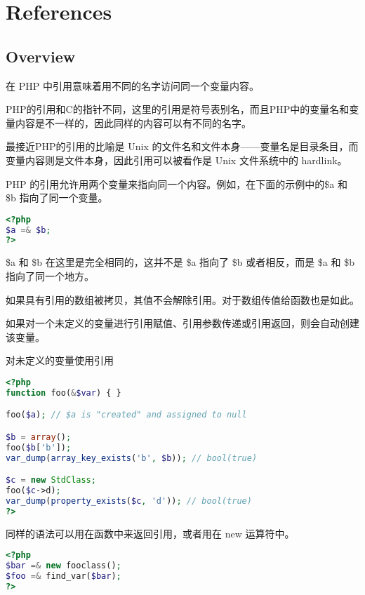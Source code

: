 \part{References}


\chapter{Overview}


在 PHP 中引用意味着用不同的名字访问同一个变量内容。

PHP的引用和C的指针不同，这里的引用是符号表别名，而且PHP中的变量名和变量内容是不一样的，因此同样的内容可以有不同的名字。

最接近PHP的引用的比喻是 Unix 的文件名和文件本身——变量名是目录条目，而变量内容则是文件本身，因此引用可以被看作是 Unix 文件系统中的 hardlink。

PHP 的引用允许用两个变量来指向同一个内容。例如，在下面的示例中的\$a 和 \$b 指向了同一个变量。

\begin{lstlisting}[language=PHP]
<?php
$a =& $b;
?>
\end{lstlisting}

\$a 和 \$b 在这里是完全相同的，这并不是 \$a 指向了 \$b 或者相反，而是 \$a 和 \$b 指向了同一个地方。

\begin{compactitem}
\item 如果具有引用的数组被拷贝，其值不会解除引用。对于数组传值给函数也是如此。
\item 如果对一个未定义的变量进行引用赋值、引用参数传递或引用返回，则会自动创建该变量。
\end{compactitem}


\begin{example}
对未定义的变量使用引用
\begin{lstlisting}[language=PHP]
<?php
function foo(&$var) { }

foo($a); // $a is "created" and assigned to null

$b = array();
foo($b['b']);
var_dump(array_key_exists('b', $b)); // bool(true)

$c = new StdClass;
foo($c->d);
var_dump(property_exists($c, 'd')); // bool(true)
?>
\end{lstlisting}
\end{example}

同样的语法可以用在函数中来返回引用，或者用在 new 运算符中。

\begin{lstlisting}[language=PHP]
<?php
$bar =& new fooclass();
$foo =& find_var($bar);
?>
\end{lstlisting}


